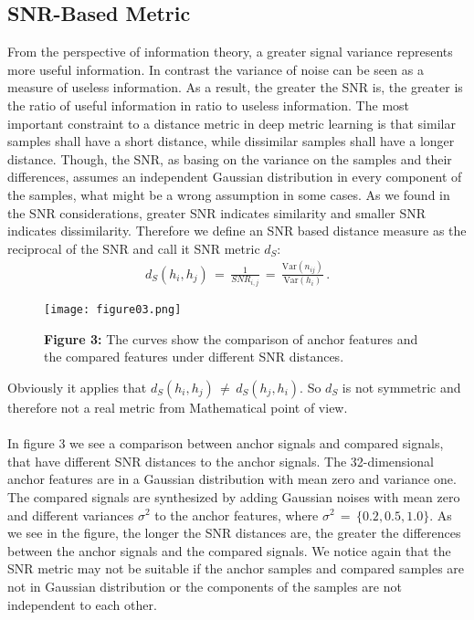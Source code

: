 \documentclass[12pt,paper=a4]{scrartcl}
\theoremstyle{break}
\begin{document}
\subsection{SNR-Based Metric}
From the perspective of information theory, a greater signal variance represents more useful information. In contrast the variance of noise can be seen as a measure of useless information. As a result, the greater the SNR is, the greater is the ratio of useful information in ratio to useless information. The most important constraint to a distance metric in deep metric learning is that similar samples shall have a short distance, while dissimilar samples shall have a longer distance. Though, the SNR, as basing on the variance on the samples and their differences, assumes an independent Gaussian distribution in every component of the samples, what might be a wrong assumption in some cases. As we found in the SNR considerations, greater SNR indicates similarity and smaller SNR indicates dissimilarity. Therefore we define an SNR based distance measure as the reciprocal of the SNR and call it SNR metric $d_S$:
\begin{align}
d_S(h_i,h_j)\,=\,\frac{1}{SNR_{i,j}}\,=\,\frac{\mathrm{Var}(n_{ij})}{\mathrm{Var}(h_i)}\,.
\end{align}
\begin{figure}[h]
	\centering
  \texttt{[image: figure03.png]}
  \caption{\textbf{Figure 3:} The curves show the comparison of anchor features and the compared features under different SNR distances.\cite{source1}}
\end{figure}
Obviously it applies that $d_S(h_i,h_j)\,\neq\,d_S(h_j,h_i)$. So $d_S$ is not symmetric and therefore not a real metric from Mathematical point of view. \\ \\
In figure 3 we see a comparison between anchor signals and compared signals, that have different SNR distances to the anchor signals. The 32-dimensional anchor features are in a Gaussian distribution with mean zero and variance one. The compared signals are synthesized by adding Gaussian noises with mean zero and different variances $\sigma^2$ to the anchor features, where $\sigma^2\,=\,\{0.2,0.5,1.0\}$. As we see in the figure, the longer the SNR distances are, the greater the differences between the anchor signals and the compared signals. We notice again that the SNR metric may not be suitable if the anchor samples and compared samples are not in Gaussian distribution or the components of the samples are not independent to each other.
\end{document}
